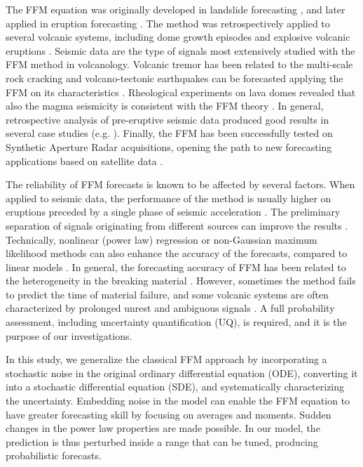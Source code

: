 \documentclass{article}
\begin{document}
The FFM equation was originally developed in landslide forecasting \citep{Fukuzuno1985, Voight1987, Voight1988b, Voight1989b}, and later applied in eruption forecasting \citep{Voight1988, Voight1989, Cornelius1995}. The method was retrospectively applied to several volcanic systems, including dome growth episodes and explosive volcanic eruptions \citep{Voight1991, Cornelius1994, Cornelius1996, Voight2000}. Seismic data are the type of signals most extensively studied with the FFM method in volcanology. Volcanic tremor has been related to the multi-scale rock cracking \citep{Kilburn1998,Ortiz2003,Kilburn2003,Smith2009} and volcano-tectonic earthquakes can be forecasted applying the FFM on its characteristics \citep{Tarraga2006}. Rheological experiments on lava domes revealed that also the magma seismicity is consistent with the FFM theory \citep{Lavallee2008}. In general, retrospective analysis of pre-eruptive seismic data produced good results in several case studies (e.g. \cite{Smith2010, Budi2013, Chardot2013}). Finally, the FFM has been successfully tested on Synthetic Aperture Radar acquisitions, opening the path to new forecasting applications based on satellite data \citep{Moretto2016}.

The reliability of FFM forecasts is known to be affected by several factors. When applied to seismic data, the performance of the method is usually higher on eruptions preceded by a single phase of seismic acceleration \citep{Boue2015}. The preliminary separation of signals originating from different sources can improve the results \citep{Salvage2016, Salvage2017}. Technically, nonlinear (power law) regression or non-Gaussian maximum likelihood methods can also enhance the accuracy of the forecasts, compared to linear models \citep{Bell2011, Bell2013}. In general, the forecasting accuracy of FFM has been related to the heterogeneity in the breaking material \citep{Vasseur2015}. However, sometimes the method fails to predict the time of material failure, and some volcanic systems are often characterized by prolonged unrest and ambiguous signals \citep{Chiodini2016}. A full probability assessment, including uncertainty quantification (UQ), is required, and it is the purpose of our investigations.

In this study, we generalize the classical FFM approach by incorporating a stochastic noise in the original ordinary differential equation (ODE), converting it into a stochastic differential equation (SDE), and systematically characterizing the uncertainty. Embedding noise in the model can enable the FFM equation to have greater forecasting skill by focusing on averages and moments. Sudden changes in the power law properties are made possible. In our model, the prediction is thus perturbed inside a range that can be tuned, producing probabilistic forecasts.
\end{document}
